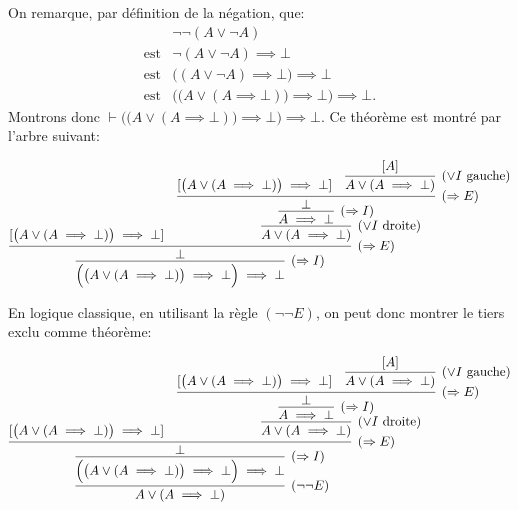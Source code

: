 \documentclass[12pt,french,a4paper]{article}
\begin{document}
\begin{question}

On remarque, par définition de la négation, que:
\begin{eqnarray*}
& \neg \neg (A \vee \neg A) \\
\mbox{est} &\neg (A \vee \neg A) \implies \bot \\
\mbox{est} & \big( (A \vee \neg A) \implies \bot\big) \implies \bot \\
\mbox{est} & \Big( \big(A \vee (A \implies \bot) \big) \implies \bot \Big) \implies \bot.
\end{eqnarray*}
Montrons donc $\vdash \Big( \big(A \vee (A \implies \bot) \big) \implies \bot \Big) \implies \bot$.
Ce théorème est montré par l'arbre suivant:

\[
\infer[(\Rightarrow{}I)]{\Big( \big(A \vee (A \implies \bot) \big) \implies \bot \Big) \implies \bot}{
\infer[(\Rightarrow{}E)]{\bot}{[\big(A \vee (A \implies \bot) \big) \implies \bot] & 
\infer[(\vee I \text{ droite})]{A \vee (A \implies \bot)}{
\infer[(\Rightarrow{}I)]{A \implies \bot}{
\infer[(\Rightarrow{}E)]{\bot}{[\big(A \vee (A \implies \bot) \big) \implies \bot] & 
\infer[(\vee I \text{ gauche})]{A \vee (A \implies \bot)}{[A]}
}
}
}
}
}
\]

En logique classique, en utilisant la règle $(\neg \neg E)$, on peut donc montrer le tiers exclu comme théorème:

\[
\infer[(\neg \neg E)]{A \vee (A \implies \bot)}{
\infer[(\Rightarrow{}I)]{\Big( \big(A \vee (A \implies \bot) \big) \implies \bot \Big) \implies \bot}{
\infer[(\Rightarrow{}E)]{\bot}{[\big(A \vee (A \implies \bot) \big) \implies \bot] & 
\infer[(\vee I \text{ droite})]{A \vee (A \implies \bot)}{
\infer[(\Rightarrow{}I)]{A \implies \bot}{
\infer[(\Rightarrow{}E)]{\bot}{[\big(A \vee (A \implies \bot) \big) \implies \bot] & 
\infer[(\vee I \text{ gauche})]{A \vee (A \implies \bot)}{[A]}
}
}
}
}
}
}
\]


\end{question}
\end{document}
